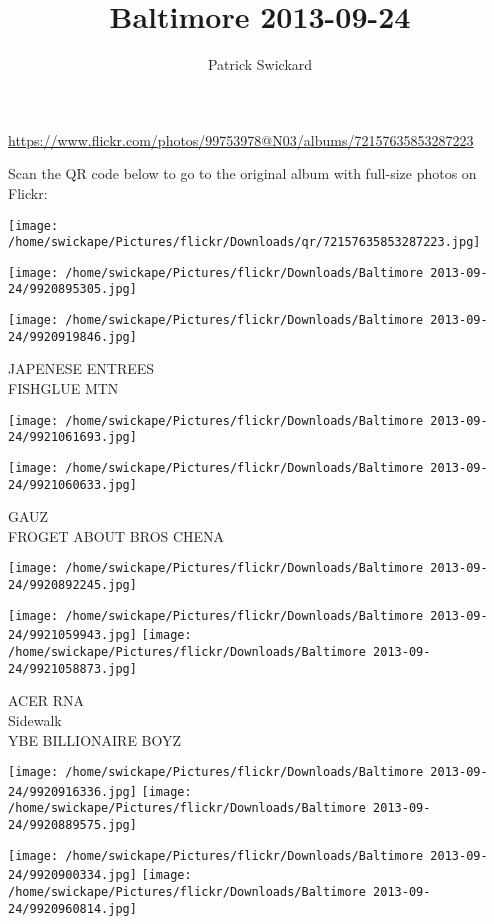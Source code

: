 \documentclass[10pt,letterpaper]{article}
\title{Baltimore 2013-09-24}
\author{Patrick Swickard}
\date{}
\begin{document}
\maketitle

\url{https://www.flickr.com/photos/99753978@N03/albums/72157635853287223}

Scan the QR code below to go to the original album with full-size photos on Flickr:

\texttt{[image: /home/swickape/Pictures/flickr/Downloads/qr/72157635853287223.jpg]}
\pagebreak

\texttt{[image: /home/swickape/Pictures/flickr/Downloads/Baltimore 2013-09-24/9920895305.jpg]}

\vspace{0.25in}
\texttt{[image: /home/swickape/Pictures/flickr/Downloads/Baltimore 2013-09-24/9920919846.jpg]}

JAPENESE ENTREES\\
FISHGLUE MTN
\pagebreak

\texttt{[image: /home/swickape/Pictures/flickr/Downloads/Baltimore 2013-09-24/9921061693.jpg]}

\vspace{0.25in}
\texttt{[image: /home/swickape/Pictures/flickr/Downloads/Baltimore 2013-09-24/9921060633.jpg]}

GAUZ\\
FROGET ABOUT BROS CHENA
\pagebreak

\texttt{[image: /home/swickape/Pictures/flickr/Downloads/Baltimore 2013-09-24/9920892245.jpg]}

\vspace{0.25in}
\texttt{[image: /home/swickape/Pictures/flickr/Downloads/Baltimore 2013-09-24/9921059943.jpg]}
\texttt{[image: /home/swickape/Pictures/flickr/Downloads/Baltimore 2013-09-24/9921058873.jpg]}

ACER RNA\\
Sidewalk\\
YBE BILLIONAIRE BOYZ
\pagebreak

\texttt{[image: /home/swickape/Pictures/flickr/Downloads/Baltimore 2013-09-24/9920916336.jpg]}
\texttt{[image: /home/swickape/Pictures/flickr/Downloads/Baltimore 2013-09-24/9920889575.jpg]}

\texttt{[image: /home/swickape/Pictures/flickr/Downloads/Baltimore 2013-09-24/9920900334.jpg]}
\texttt{[image: /home/swickape/Pictures/flickr/Downloads/Baltimore 2013-09-24/9920960814.jpg]}
\end{document}
